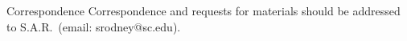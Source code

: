 \documentclass{nature_arxiv}
\begin{document}
\maketitle

\vspace{10pt}

\vspace{10pt}

\makeaffil

\begin{multicols}{2}






\end{multicols}



\begin{methods}
 
 
 
 
 
 
 
 
 
 
 
 
\end{methods}





{}




\begin{addendum}
 \item 
 \item[Correspondence] Correspondence and requests for materials
should be addressed to S.A.R.~(email: srodney@sc.edu).
\end{addendum}



\end{document}
